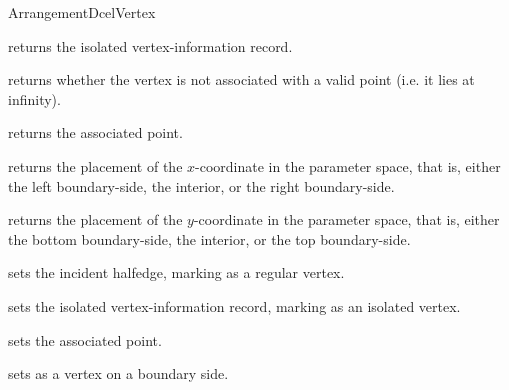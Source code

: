 \begin{ccRefConcept}{ArrangementDcelVertex}
{
    {returns the isolated vertex-information record.
     }

    {returns whether the vertex is not associated with a valid point (i.e. it
     lies at infinity).}

    {returns the associated point.
     }

    {returns the placement of the $x$-coordinate in the parameter space,
    that is, either the left boundary-side, the interior, or the right
    boundary-side.}

    {returns the placement of the $y$-coordinate in the parameter space,
    that is, either the bottom boundary-side, the interior, or the top
    boundary-side.}

\ccModifiers

    {sets the incident halfedge, marking \ccVar{} as a regular vertex.}

    {sets the isolated vertex-information record, marking \ccVar{}
     as an isolated vertex.}

    {sets the associated point.}

    {sets \ccVar{} as a vertex on a boundary side.
     }

} %

\ccSeeAlso

\\
\\

\end{ccRefConcept}  

\ccRefPageEnd

